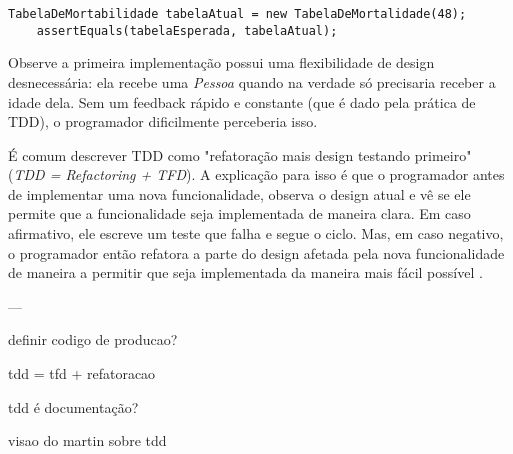 \begin{lstlisting}[frame=trbl]
	TabelaDeMortabilidade tabelaAtual = new TabelaDeMortalidade(48);
	assertEquals(tabelaEsperada, tabelaAtual);
\end{lstlisting}

Observe a primeira implementação possui uma flexibilidade de design desnecessária: ela recebe uma \textit{Pessoa} quando na verdade só
precisaria receber a idade dela. Sem um feedback rápido e constante (que é dado pela prática de TDD), o programador dificilmente
perceberia isso.

É comum descrever TDD como "refatoração mais design testando primeiro" (\textit{TDD = Refactoring + TFD}). A explicação para isso é que o programador
antes de implementar uma nova funcionalidade, observa o design atual e vê se ele permite que a funcionalidade seja implementada de maneira clara.
Em caso afirmativo, ele escreve um teste que falha e segue o ciclo. Mas, em caso negativo, o programador então refatora a parte do design afetada
pela nova funcionalidade de maneira a permitir que seja implementada da maneira mais fácil possível \cite{wambler-tdd}.

---


definir codigo de producao?


tdd = tfd + refatoracao

tdd é documentação?

visao do martin sobre tdd


